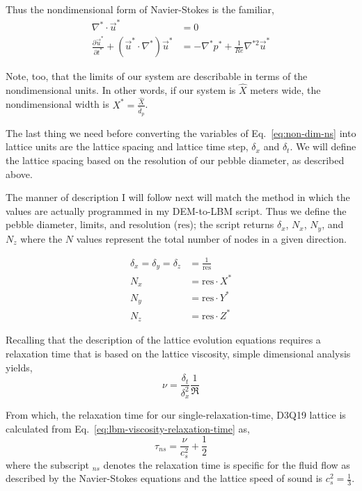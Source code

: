 Thus the nondimensional form of Navier-Stokes is the familiar,
\begin{subequations}\label{eq:non-dim-ns}
\begin{align}
	\nabla^* \cdot \vec{u}^* &= 0 \\
	\frac{\partial \vec{u}^*}{\partial t^*} + (\vec{u}^*\cdot\nabla^*)\vec{u}^* &= -\nabla^*p^* + \frac{1}{Re}\nabla^{*2}\vec{u}^*
\end{align}
\end{subequations}

Note, too, that the limits of our system are describable in terms of the nondimensional units. In other words, if our system is $\hat{X}$ meters wide, the nondimensional width is $X^*=\frac{\hat{X}}{\hat{d}_p}$.  

The last thing we need before converting the variables of Eq.~\ref{eq:non-dim-ns} into lattice units are the lattice spacing and lattice time step, $\delta_x$ and $\delta_t$. We will define the lattice spacing based on the resolution of our pebble diameter, as described above.

The manner of description I will follow next will match the method in which the values are actually programmed in my DEM-to-LBM script. Thus we define the pebble diameter, limits, and resolution ($\text{res}$); the script returns $\delta_x$, $N_x$, $N_y$, and $N_z$ where the $N$ values represent the total number of nodes in a given direction.

\begin{subequations}
\begin{align}
	\delta_x = \delta_y = \delta_z & = \frac{1}{\text{res}} \\
	N_x & = \text{res}\cdot X^* \\
	N_y & = \text{res}\cdot Y^* \\
	N_z & = \text{res}\cdot Z^*
\end{align}
\end{subequations}

Recalling that the description of the lattice evolution equations requires a relaxation time that is based on the lattice viscosity, simple dimensional analysis yields,
\begin{equation}
	\nu = \frac{\delta_t}{\delta_x^2}\frac{1}{\Re}
\end{equation}

From which, the relaxation time for our single-relaxation-time, D3Q19 lattice is calculated from Eq.~\ref{eq:lbm-viscosity-relaxation-time} as,
\begin{equation}
	\tau_{ns} = \frac{\nu}{c_s^2} + \frac{1}{2}
\end{equation}
where the subscript $_{ns}$ denotes the relaxation time is specific for the fluid flow as described by the Navier-Stokes equations and the lattice speed of sound is $c_s^2 = \frac{1}{3}$.

